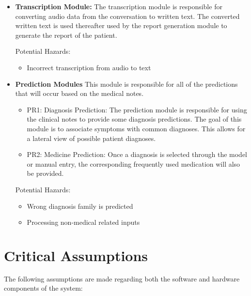 \documentclass{article}
\begin{document}
\begin{itemize}
    \item \textbf{Transcription Module:}
    The transcription module is responsible for converting audio data from the conversation to written text. The converted written text is used thereafter used by the report generation module to generate the report of the patient.

    Potential Hazards:
    \begin{itemize}
        \item Incorrect transcription from audio to text
    \end{itemize}

    \item \textbf{Prediction Modules}
    This module is responsible for all of the predictions that will occur based on the medical notes.

    \begin{itemize}
        \item PR1: Diagnosis Prediction: The prediction module is responsible for using the clinical notes to provide some diagnosis predictions. The goal of this module is to associate symptoms with common diagnoses. This allows for a lateral view of possible patient diagnoses.
        \item PR2: Medicine Prediction: Once a diagnosis is selected through the model or manual entry, the corresponding frequently used medication will also be provided.
    \end{itemize}
    
    Potential Hazards:
    \begin{itemize}
        \item Wrong diagnosis family is predicted
        \item Processing non-medical related inputs
    \end{itemize}
    
\end{itemize}


\section{Critical Assumptions}

The following assumptions are made regarding both the software and hardware components of the system:
\end{document}
